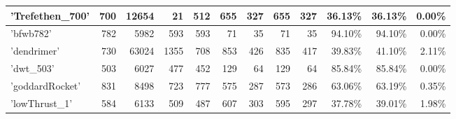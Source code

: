 \begin{table}[h]
{\begin{tabular}{|l|r|r|r|r|r|r|r|r|r|r|r|}
\hline
'Trefethen\_700'              & 700                                                     & 12654                                               & 21                      & 512                     & 655                     & 327                     & 655                     & 327                     & 36.13\%                             & 36.13\%                            & 0.00\%                         \\ 
\hline
'bfwb782'                     & 782                                                     & 5982                                                & 593                     & 593                     & 71                      & 35                      & 71                      & 35                      & 94.10\%                             & 94.10\%                            & 0.00\%                         \\ 
\hline
'dendrimer'                   & 730                                                     & 63024                                               & 1355                    & 708                     & 853                     & 426                     & 835                     & 417                     & 39.83\%                             & 41.10\%                            & 2.11\%                         \\ 
\hline
'dwt\_503'                    & 503                                                     & 6027                                                & 477                     & 452                     & 129                     & 64                      & 129                     & 64                      & 85.84\%                             & 85.84\%                            & 0.00\%                         \\ 
\hline
'goddardRocket'     & 831                                                     & 8498                                                & 723                     & 777                     & 575                     & 287                     & 573                     & 286                     & 63.06\%                             & 63.19\%                            & 0.35\%                         \\ 
\hline
'lowThrust\_1'                & 584                                                     & 6133                                                & 509                     & 487                     & 607                     & 303                     & 595                     & 297                     & 37.78\%                             & 39.01\%                            & 1.98\%                         \\ 

\end{tabular}}
\end{table}
